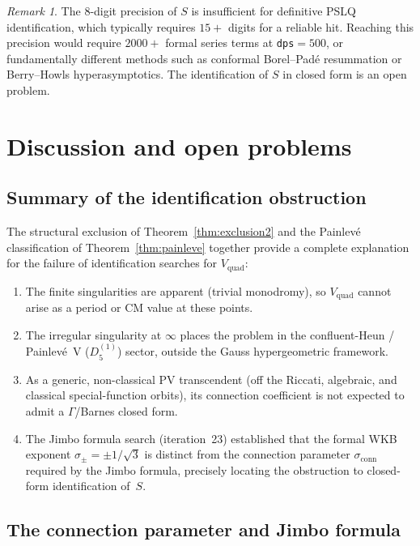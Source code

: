 \documentclass[11pt,a4paper]{article}
\theoremstyle{definition}
\theoremstyle{remark}
\newtheorem{remark}[theorem]{Remark}
\newcommand{\Vq}{V_{\mathrm{quad}}}
\begin{document}
\begin{remark}
The $8$-digit precision of $S$ is insufficient
for definitive PSLQ identification, which
typically requires $15+$ digits for a
reliable hit. Reaching this precision would
require $2000+$ formal series terms at
\texttt{dps}$=500$, or fundamentally
different methods such as conformal
Borel--Pad\'e resummation or Berry--Howls
hyperasymptotics. The identification of $S$
in closed form is an open problem.
\end{remark}


\section{Discussion and open problems}
\label{sec:discussion}

\subsection{Summary of the identification
obstruction}

The structural exclusion of
Theorem~\ref{thm:exclusion2} and the
Painlev\'e classification of
Theorem~\ref{thm:painleve} together
provide a complete explanation for the
failure of identification searches
for $\Vq$:
\begin{enumerate}
\item The finite singularities are apparent
  (trivial monodromy), so $\Vq$ cannot arise
  as a period or CM value at these points.
\item The irregular singularity at $\infty$
  places the problem in the confluent-Heun /
  Painlev\'e~V ($D_5^{(1)}$) sector, outside
  the Gauss hypergeometric framework.
\item As a generic, non-classical PV
  transcendent (off the Riccati, algebraic,
  and classical special-function orbits),
  its connection coefficient is not expected
  to admit a $\Gamma$/Barnes closed form.
\item The Jimbo formula search (iteration~23)
  established that the formal WKB exponent
  $\sigma_\pm = \pm 1/\sqrt{3}$ is distinct
  from the connection parameter
  $\sigma_{\mathrm{conn}}$ required by the
  Jimbo formula, precisely locating the
  obstruction to closed-form identification
  of~$S$.
\end{enumerate}

\subsection{The connection parameter and
Jimbo formula}
\end{document}
